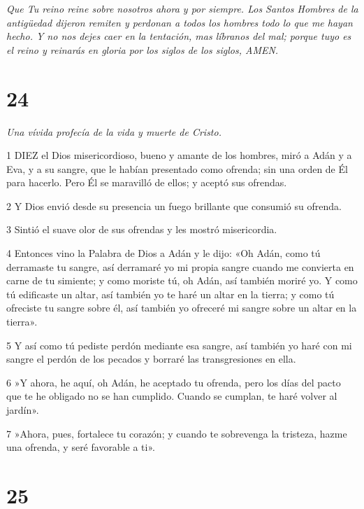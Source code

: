 \par \textit{Que Tu reino reine sobre nosotros ahora y por siempre. Los Santos Hombres de la antigüedad dijeron remiten y perdonan a todos los hombres todo lo que me hayan hecho. Y no nos dejes caer en la tentación, mas líbranos del mal; porque tuyo es el reino y reinarás en gloria por los siglos de los siglos, AMEN.}

\chapter{24}

\par \textit{Una vívida profecía de la vida y muerte de Cristo.}

\par 1 DIEZ el Dios misericordioso, bueno y amante de los hombres, miró a Adán y a Eva, y a su sangre, que le habían presentado como ofrenda; sin una orden de Él para hacerlo. Pero Él se maravilló de ellos; y aceptó sus ofrendas.

\par 2 Y Dios envió desde su presencia un fuego brillante que consumió su ofrenda.

\par 3 Sintió el suave olor de sus ofrendas y les mostró misericordia.

\par 4 Entonces vino la Palabra de Dios a Adán y le dijo: «Oh Adán, como tú derramaste tu sangre, así derramaré yo mi propia sangre cuando me convierta en carne de tu simiente; y como moriste tú, oh Adán, así también moriré yo. Y como tú edificaste un altar, así también yo te haré un altar en la tierra; y como tú ofreciste tu sangre sobre él, así también yo ofreceré mi sangre sobre un altar en la tierra».

\par 5 Y así como tú pediste perdón mediante esa sangre, así también yo haré con mi sangre el perdón de los pecados y borraré las transgresiones en ella.

\par 6 »Y ahora, he aquí, oh Adán, he aceptado tu ofrenda, pero los días del pacto que te he obligado no se han cumplido. Cuando se cumplan, te haré volver al jardín».

\par 7 »Ahora, pues, fortalece tu corazón; y cuando te sobrevenga la tristeza, hazme una ofrenda, y seré favorable a ti».

\chapter{25}

